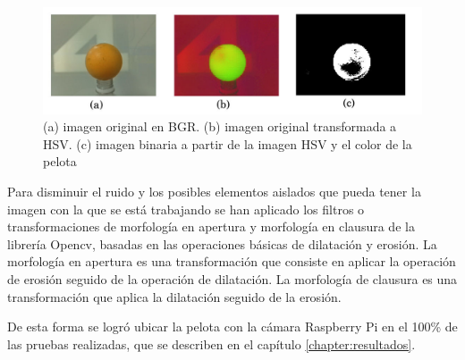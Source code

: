 \begin{figure}[hbtp]
\centering
\includegraphics[scale=0.36]{imagenes/HSVyBinaria.jpg}
\caption{(a) imagen original en BGR. (b) imagen original transformada a HSV. (c) imagen binaria a partir de la imagen HSV y el color de la pelota}
\label{fig:proces}
\end{figure}

Para disminuir el ruido y los posibles elementos aislados que pueda tener la imagen con la que se está trabajando se han aplicado los filtros o transformaciones de morfología en apertura y morfología en clausura de la librería Opencv, basadas en las operaciones básicas de dilatación y erosión. La morfología en apertura es una transformación que consiste en aplicar la operación de erosión seguido de la operación de dilatación. La morfología de clausura es una transformación que aplica la dilatación seguido de la erosión.

De esta forma se logró ubicar la pelota con la cámara Raspberry Pi en el 100\% de las pruebas realizadas, que se describen en el cap\'itulo \ref{chapter:resultados}.



